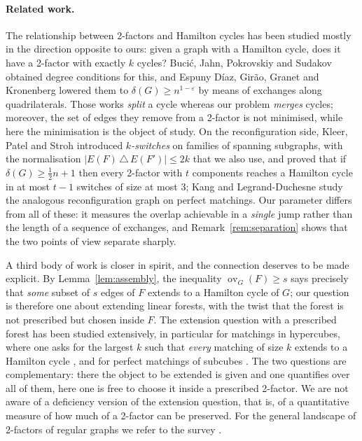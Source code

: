 \documentclass[11pt,a4paper]{article}
\theoremstyle{definition}
\theoremstyle{remark}
\newcommand{\ov}{\operatorname{ov}}
\begin{document}
\paragraph{Related work.} The relationship between 2-factors and Hamilton cycles has been studied mostly in the direction opposite to ours: given a graph with a Hamilton cycle, does it have a 2-factor with exactly $k$ cycles? Bucić, Jahn, Pokrovskiy and Sudakov \cite{bjps} obtained degree conditions for this, and Espuny Díaz, Girão, Granet and Kronenberg \cite{eggk} lowered them to $\delta(G)\ge n^{1-\varepsilon}$ by means of exchanges along quadrilaterals. Those works \emph{split} a cycle whereas our problem \emph{merges} cycles; moreover, the set of edges they remove from a 2-factor is not minimised, while here the minimisation is the object of study. On the reconfiguration side, Kleer, Patel and Stroh \cite{kps} introduced \emph{$k$-switches} on families of spanning subgraphs, with the normalisation $|E(F)\,\triangle\,E(F')|\le2k$ that we also use, and proved that if $\delta(G)\ge\frac12n+1$ then every 2-factor with $t$ components reaches a Hamilton cycle in at most $t-1$ switches of size at most $3$; Kang and Legrand-Duchesne \cite{kld} study the analogous reconfiguration graph on perfect matchings. Our parameter differs from all of these: it measures the overlap achievable in a \emph{single} jump rather than the length of a sequence of exchanges, and Remark~\ref{rem:separation} shows that the two points of view separate sharply.

A third body of work is closer in spirit, and the connection deserves to be made explicit. By Lemma~\ref{lem:assembly}, the inequality $\ov_G(F)\ge s$ says precisely that \emph{some} subset of $s$ edges of $F$ extends to a Hamilton cycle of $G$; our question is therefore one about extending linear forests, with the twist that the forest is not prescribed but chosen inside $F$. The extension question with a prescribed forest has been studied extensively, in particular for matchings in hypercubes, where one asks for the largest $k$ such that \emph{every} matching of size $k$ extends to a Hamilton cycle \cite{wz16}, and for perfect matchings of subcubes \cite{gregor09}. The two questions are complementary: there the object to be extended is given and one quantifies over all of them, here one is free to choose it inside a prescribed 2-factor. We are not aware of a deficiency version of the extension question, that is, of a quantitative measure of how much of a 2-factor can be preserved. For the general landscape of 2-factors of regular graphs we refer to the survey \cite{labbate}.
\end{document}
